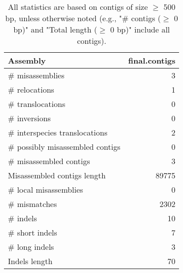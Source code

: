 \documentclass[12pt,a4paper]{article}
\begin{document}
\begin{table}[ht]
\begin{center}
\caption{All statistics are based on contigs of size $\geq$ 500 bp, unless otherwise noted (e.g., "\# contigs ($\geq$ 0 bp)" and "Total length ($\geq$ 0 bp)" include all contigs).}
\begin{tabular}{|l*{1}{|r}|}
\hline
Assembly & final.contigs \\ \hline
\# misassemblies & 3 \\ \hline
\hspace{5mm}\# relocations & 1 \\ \hline
\hspace{5mm}\# translocations & 0 \\ \hline
\hspace{5mm}\# inversions & 0 \\ \hline
\hspace{5mm}\# interspecies translocations & 2 \\ \hline
\# possibly misassembled contigs & 0 \\ \hline
\# misassembled contigs & 3 \\ \hline
Misassembled contigs length & 89775 \\ \hline
\# local misassemblies & 0 \\ \hline
\# mismatches & 2302 \\ \hline
\# indels & 10 \\ \hline
\hspace{5mm}\# short indels & 7 \\ \hline
\hspace{5mm}\# long indels & 3 \\ \hline
Indels length & 70 \\ \hline
\end{tabular}
\end{center}
\end{table}
\end{document}
